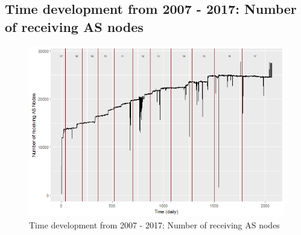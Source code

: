 \documentclass[conference, 11pt]{IEEEtran}
\begin{document}
\begin{appendices}
\section{Time development from 2007 - 2017: Number of receiving AS nodes}

\begin{figure}[htbp]
\centerline{\includegraphics[scale=0.4]{Graphics/ASToAll.png}}
\caption{Time development from 2007 - 2017: Number of receiving AS nodes}
\label{fig}
\end{figure}
\end{appendices}
\end{document}
